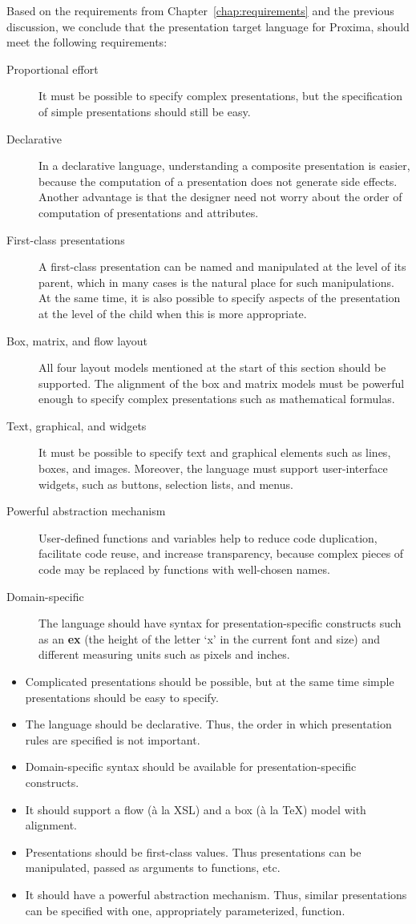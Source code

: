 Based on the requirements from Chapter~\ref{chap:requirements} and the previous discussion, we conclude that the presentation target language for Proxima, should meet the following requirements: 

\begin{description}
\item[Proportional effort]
It must be possible to specify complex presentations, but the specification of simple presentations should still be easy.
\item[Declarative]
In a declarative language, understanding a composite presentation is easier, because the computation of a presentation does not generate side effects. Another advantage is that the designer need not worry about the order of computation of presentations and attributes.
\item[First-class presentations]
A first-class presentation can be named and manipulated at the level of its parent, which in many cases is the natural place for such manipulations. At the same time, it is also possible to specify aspects of the presentation at the level of the child when this is more appropriate.
\item[Box, matrix, and flow layout]
All four layout models mentioned at the start of this section should be supported. The alignment of the box and matrix models must be powerful enough to specify complex presentations such as mathematical formulas. 
\item[Text, graphical, and widgets]
It must be possible to specify text and graphical elements such as lines, boxes, and images. Moreover, the language must support user-interface widgets, such as buttons, selection lists, and menus. 
\item[Powerful abstraction mechanism]
User-defined functions and variables help to reduce code duplication, facilitate code reuse, and increase transparency, because complex pieces of code may be replaced by functions with well-chosen names.
\item[Domain-specific]
The language should have syntax for presentation-specific constructs such as an {\bf ex} (the height of the letter `x' in the current font and size) and different measuring units such as pixels and inches.
\end{description}
\bc
\begin{itemize}
\item Complicated presentations should be possible, but at the same time simple presentations should be easy to specify.
\item The language should be declarative. Thus, the order in which presentation rules are specified is not important.
\item Domain-specific syntax should be available for presentation-specific constructs. 
\item It should support a flow (\`a la XSL) and a box (\`a la \TeX) model with alignment.
\item Presentations should be first-class values. Thus presentations can be manipulated, passed as arguments to functions, etc.
\item It should have a powerful abstraction mechanism. Thus, similar presentations can be specified with one, appropriately parameterized, function.
\end{itemize}

